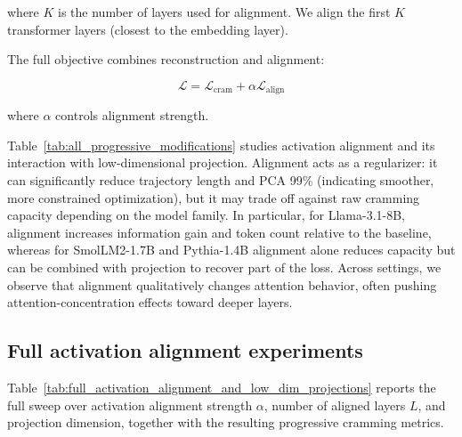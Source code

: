 where $K$ is the number of layers used for alignment. We align the first $K$ transformer layers (closest to the embedding layer).

The full objective combines reconstruction and alignment:

\begin{equation}
    \mathcal{L} = \mathcal{L}_{\text{cram}} + \alpha \mathcal{L}_{\text{align}}
\end{equation}

where $\alpha$ controls alignment strength.

Table~\ref{tab:all_progressive_modifications} studies activation alignment and its interaction with low-dimensional projection.
Alignment acts as a regularizer: it can significantly reduce trajectory length and PCA 99\% (indicating smoother, more constrained optimization), but it may trade off against raw cramming capacity depending on the model family.
In particular, for Llama-3.1-8B, alignment increases information gain and token count relative to the baseline, whereas for SmolLM2-1.7B and Pythia-1.4B alignment alone reduces capacity but can be combined with projection to recover part of the loss.
Across settings, we observe that alignment qualitatively changes attention behavior, often pushing attention-concentration effects toward deeper layers.

\begin{table}[t]
    \centering
    \caption{Progressive cramming variants and key metrics across model families. For each family we report baseline progressive cramming, low-dimensional projection only (``dim''), activation alignment only ($\alpha$, $L$), and their combination.}
    \label{tab:all_progressive_modifications}

    \begin{small}
    
    \end{small}

\end{table}


\subsection{Full activation alignment experiments}

Table~\ref{tab:full_activation_alignment_and_low_dim_projections} reports the full sweep over activation alignment strength \(\alpha\), number of aligned layers \(L\), and projection dimension, together with the resulting progressive cramming metrics.

